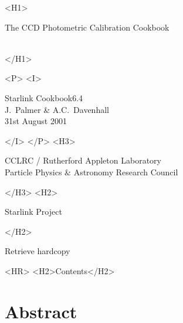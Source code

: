 \documentclass[twoside,11pt]{article}
\newcommand{\stardoccategory}  {Starlink Cookbook}
\newcommand{\stardocsource}    {sc\stardocnumber}
\newcommand{\stardocnumber}    {6.4}
\newcommand{\stardocauthors}   {J.~Palmer \& A.C.~Davenhall}
\newcommand{\stardocdate}      {31st August 2001}
\newcommand{\stardoctitle}     {The CCD Photometric Calibration Cookbook}
\newcommand{\htmladdnormallink}[2]{#1}
\newcommand{\htmladdimg}[1]{}
\newcommand{\htmlref}[2]{#1}
\newcommand{\htmladdtonavigation}[1]{}
\newcommand{\xlabel}[1]{}
\newcommand{\latexonlytoc}[0]{\tableofcontents}
\begin{document}
\begin{htmlonly}
   \xlabel{}
   \begin{rawhtml} <H1> \end{rawhtml}
      \stardoctitle\\
      \stardocversion\\
      \stardocmanual
   \begin{rawhtml} </H1> \end{rawhtml}


   \begin{rawhtml} <P> <I> \end{rawhtml}
   \stardoccategory \stardocnumber \\
   \stardocauthors \\
   \stardocdate
   \begin{rawhtml} </I> </P> <H3> \end{rawhtml}
      \htmladdnormallink{CCLRC}{http://www.cclrc.ac.uk} /
      \htmladdnormallink{Rutherford Appleton Laboratory}
                        {http://www.cclrc.ac.uk/ral} \\
      \htmladdnormallink{Particle Physics \& Astronomy Research Council}
                        {http://www.pparc.ac.uk} \\
   \begin{rawhtml} </H3> <H2> \end{rawhtml}
      \htmladdnormallink{Starlink Project}{http://star-www.rl.ac.uk/}
   \begin{rawhtml} </H2> \end{rawhtml}
   \htmladdnormallink{\htmladdimg{source.gif} Retrieve hardcopy}
      {http://star-www.rl.ac.uk/cgi-bin/hcserver?\stardocsource}\\

  \label{stardoccontents}
  \begin{rawhtml} 
    <HR>
    <H2>Contents</H2>
  \end{rawhtml}
  \renewcommand{\latexonlytoc}[0]{}
  \htmladdtonavigation{\htmlref{\htmladdimg{contents_motif.gif}}
        {stardoccontents}}

  \section{\xlabel{abstract}Abstract}
\end{htmlonly}
\end{document}
